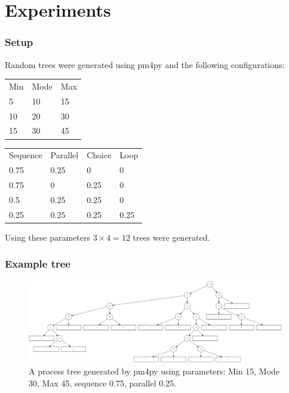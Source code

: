 \documentclass{beamer}
\begin{document}
	\section{Experiments}
	\begin{frame}
		\frametitle{Setup}
		Random trees were generated using pm4py and the following configurations:
		
		\begin{tabular}{lll}
			Min & Mode & Max \\
			5 & 10 & 15 \\
			10 & 20 & 30 \\
			15 & 30 & 45 \\
		\end{tabular}
		\begin{tabular}{llll}
			Sequence & Parallel & Choice & Loop \\
			0.75 & 0.25 & 0 & 0 \\
			0.75 & 0 & 0.25 & 0 \\
			0.5 & 0.25 & 0.25 & 0 \\
			0.25 & 0.25 & 0.25 & 0.25 \\
		\end{tabular}
		
		Using these parameters $3\times4=12$ trees were generated.
	\end{frame}
	\begin{frame}
		\frametitle{Example tree}
		\begin{figure}
			\includegraphics[width=1\textwidth]{figures/process-tree}
			\caption{A process tree generated by pm4py using parameters: Min 15, Mode 30, Max 45, sequence 0.75, parallel 0.25. }
			\label{fig:process-tree}
		\end{figure}
	\end{frame}
	
\end{document}
